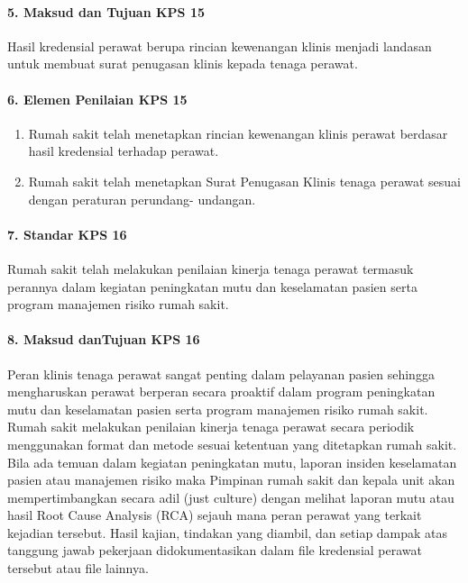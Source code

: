 \documentclass[
]{book}
\providecommand{\tightlist}{%
  \setlength{\itemsep}{0pt}\setlength{\parskip}{0pt}}
\begin{document}
\hypertarget{maksud-dan-tujuan-kps-15}{%
\paragraph*{5. Maksud dan Tujuan KPS 15}\label{maksud-dan-tujuan-kps-15}}

Hasil kredensial perawat berupa rincian kewenangan klinis menjadi landasan untuk membuat surat penugasan klinis kepada tenaga perawat.

\hypertarget{elemen-penilaian-kps-15}{%
\paragraph*{6. Elemen Penilaian KPS 15}\label{elemen-penilaian-kps-15}}

\begin{enumerate}
\def\labelenumi{\alph{enumi}.}
\tightlist
\item
  Rumah sakit telah menetapkan rincian kewenangan klinis perawat berdasar hasil kredensial terhadap perawat.
\item
  Rumah sakit telah menetapkan Surat Penugasan Klinis tenaga perawat sesuai dengan peraturan perundang- undangan.
\end{enumerate}

\hypertarget{standar-kps-16}{%
\paragraph*{7. Standar KPS 16}\label{standar-kps-16}}

Rumah sakit telah melakukan penilaian kinerja tenaga perawat termasuk perannya dalam kegiatan peningkatan mutu dan keselamatan pasien serta program manajemen risiko rumah sakit.

\hypertarget{maksud-dantujuan-kps-16}{%
\paragraph*{8. Maksud danTujuan KPS 16}\label{maksud-dantujuan-kps-16}}

Peran klinis tenaga perawat sangat penting dalam pelayanan pasien sehingga mengharuskan perawat berperan secara proaktif dalam program peningkatan mutu dan keselamatan pasien serta program manajemen risiko rumah sakit.
Rumah sakit melakukan penilaian kinerja tenaga perawat secara periodik menggunakan format dan metode sesuai ketentuan yang ditetapkan rumah sakit.
Bila ada temuan dalam kegiatan peningkatan mutu, laporan insiden keselamatan pasien atau manajemen risiko maka Pimpinan rumah sakit dan kepala unit akan mempertimbangkan secara adil (just culture) dengan melihat laporan mutu atau hasil Root Cause Analysis (RCA) sejauh mana peran perawat yang terkait kejadian tersebut.
Hasil kajian, tindakan yang diambil, dan setiap dampak atas tanggung jawab pekerjaan didokumentasikan dalam file kredensial perawat tersebut atau file lainnya.
\end{document}
